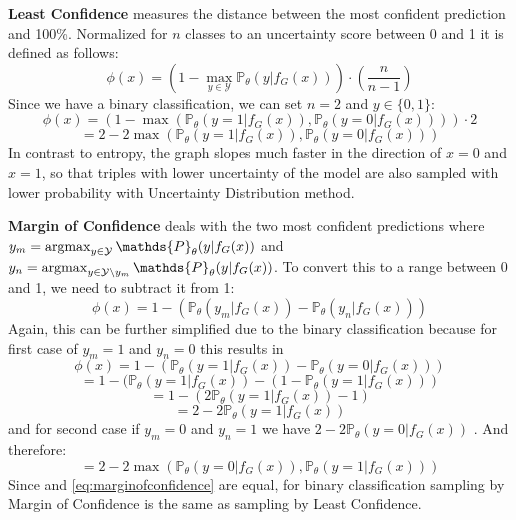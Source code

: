 \textbf{Least Confidence} 
measures the distance between the most confident prediction and 100\%.
Normalized for $n$ classes to an uncertainty score between 0 and 1 it is defined as follows:
\begin{equation}
    \phi(x) = (1 - \max_{y \in \mathcal{Y}}{\mathds{P}_{\theta}(y | f_G(x))}) \cdot \left(\frac{n}{n-1}\right)
\end{equation}
Since we have a binary classification, we can set $n = 2$ and $y \in \{0,1\}$:
\begin{equation}
    \phi(x) = (1 - \max({\mathds{P}_{\theta}(y = 1| f_G(x)), \mathds{P}_{\theta}(y = 0| f_G(x))})) \cdot 2
\end{equation}
\begin{equation} \label{eq:leastconfidence}
    = 2 - 2 \max({\mathds{P}_{\theta}(y = 1| f_G(x)), \mathds{P}_{\theta}(y = 0| f_G(x))})
\end{equation}
In contrast to entropy, the graph slopes much faster in the direction of $x = 0$ and $x = 1$, so that triples with lower uncertainty of the model are also sampled with lower probability with Uncertainty Distribution method.

\textbf{Margin of Confidence}
deals with the two most confident predictions where
$y_m = \argmax_{y \in \mathcal{Y}} \mathds{P}_{\theta}(y | f_G(x))$ 
and $y_n = \argmax_{y \in \mathcal{Y} \setminus y_m}{\mathds{P}_{\theta}(y | f_G(x))}$.
To convert this to a range between 0 and 1, we need to subtract it from 1:
\begin{equation}
    \phi(x) = 1 - (\mathds{P}_{\theta}(y_m |f_G(x)) - \mathds{P}_{\theta}(y_n | f_G(x)))
\end{equation}
Again, this can be further simplified due to the binary classification because for first case of $y_m = 1$ and $y_n = 0$ this results in
\begin{equation}
    \phi(x) = 1 - (\mathds{P}_{\theta}(y = 1 |f_G(x)) - \mathds{P}_{\theta}(y = 0 | f_G(x)))
\end{equation}
\begin{equation}
    = 1 - (\mathds{P}_{\theta}(y = 1 |f_G(x)) 
    -  (1 - \mathds{P}_{\theta}(y = 1 | f_G(x)))
\end{equation}
\begin{equation}
    = 1 - (2 \mathds{P}_{\theta}(y = 1 |f_G(x)) - 1)
\end{equation}
\begin{equation}
    = 2 - 2 \mathds{P}_{\theta}(y = 1 |f_G(x))
\end{equation}
and for second case if $y_m = 0$ and $y_n = 1$ we have  $ 2 - 2 \mathds{P}_{\theta}(y = 0 |f_G(x))$ . 
And therefore:
\begin{equation} \label{eq:marginofconfidence}
    = 2 - 2 \max(\mathds{P}_{\theta}(y = 0 |f_G(x)), \mathds{P}_{\theta}(y = 1 |f_G(x)))
\end{equation}
Since  and \ref{eq:marginofconfidence} are equal, for binary classification sampling by Margin of Confidence is the same as sampling by Least Confidence.

